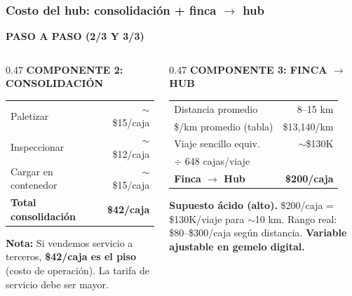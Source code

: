 \documentclass[aspectratio=169, 10pt]{beamer}
\newcommand{\tagline}[2]{{\scriptsize\color{#1}\textbf{\MakeUppercase{#2}}}}
\begin{document}
\begin{frame}
\frametitle{Costo del hub: consolidaci\'on + finca $\rightarrow$ hub}
\tagline{amarillo}{Paso a Paso (2/3 y 3/3)}
\vspace{-2pt}

\begin{columns}[T]
\begin{column}{0.47\textwidth}
{\scriptsize\color{azul}\textbf{COMPONENTE 2: CONSOLIDACI\'ON}}
\vspace{2pt}

\scriptsize
\renewcommand{\arraystretch}{1.1}
\begin{tabular}{l r}
    \toprule
    Paletizar & $\sim$\$15/caja \\
    Inspeccionar & $\sim$\$12/caja \\
    Cargar en contenedor & $\sim$\$15/caja \\
    \midrule
    \textcolor{azul}{\textbf{Total consolidaci\'on}} & \textcolor{azul}{\textbf{\$42/caja}} \\
    \bottomrule
\end{tabular}

\vspace{6pt}
\colorbox{azulclaro}{\parbox{\dimexpr\linewidth-8pt}{\tiny\strut
\textcolor{azul}{\textbf{Nota:}} Si vendemos servicio a terceros,
\textbf{\$42/caja es el piso} (costo de operaci\'on).
La tarifa de servicio debe ser mayor.\strut}}
\end{column}

\begin{column}{0.47\textwidth}
{\scriptsize\color{cian}\textbf{COMPONENTE 3: FINCA $\rightarrow$ HUB}}
\vspace{2pt}

\scriptsize
\renewcommand{\arraystretch}{1.1}
\begin{tabular}{l r}
    \toprule
    Distancia promedio & 8--15 km \\
    \$/km promedio (tabla) & \$13,140/km \\
    Viaje sencillo equiv. & $\sim$\$130K \\
    $\div$ 648 cajas/viaje & \\
    \midrule
    \textcolor{cian}{\textbf{Finca $\rightarrow$ Hub}} & \textcolor{cian}{\textbf{\$200/caja}} \\
    \bottomrule
\end{tabular}

\vspace{6pt}
\colorbox{amarilloclaro}{\parbox{\dimexpr\linewidth-8pt}{\tiny\strut
\textcolor{amarillo}{\textbf{Supuesto \'acido (alto).}}
\$200/caja = \$130K/viaje para $\sim$10 km.
Rango real: \$80--\$300/caja seg\'un distancia.
\textbf{Variable ajustable en gemelo digital.}\strut}}
\end{column}
\end{columns}
\end{frame}
\end{document}
